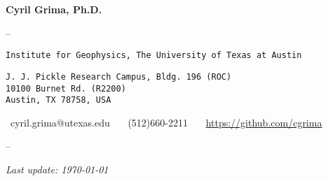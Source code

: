 \begin{center}

{\LARGE \textbf{Cyril Grima, Ph.D.}}
\vspace{.5em}

\hspace{0pt}{\large Research Assistant Professor}

--

\noindent\hspace{0pt}\texttt{Institute for Geophysics, The University of Texas at Austin}

\noindent\hspace{0pt}\texttt{J. J. Pickle Research Campus, Bldg. 196 (ROC) \\
10100 Burnet Rd. (R2200) \\
Austin, TX 78758, USA}
\vspace{.5em}

\noindent\hspace{0pt}\faInbox \ cyril.grima@utexas.edu \ \ \faPhone \ (512)660-2211 
\ \ \faGithub \ \href{https://github.com/cgrima}{https://github.com/cgrima}

--

\textit{Last update: \today}

\end{center}
\vspace{-1em}